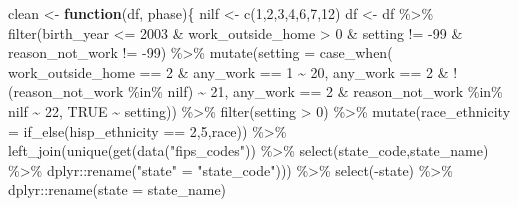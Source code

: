\documentclass[
]{article}
\newenvironment{Shaded}{\begin{snugshade}}{\end{snugshade}}
\newcommand{\AttributeTok}[1]{\textcolor[rgb]{0.77,0.63,0.00}{#1}}
\newcommand{\ConstantTok}[1]{\textcolor[rgb]{0.00,0.00,0.00}{#1}}
\newcommand{\ControlFlowTok}[1]{\textcolor[rgb]{0.13,0.29,0.53}{\textbf{#1}}}
\newcommand{\DecValTok}[1]{\textcolor[rgb]{0.00,0.00,0.81}{#1}}
\newcommand{\FunctionTok}[1]{\textcolor[rgb]{0.00,0.00,0.00}{#1}}
\newcommand{\NormalTok}[1]{#1}
\newcommand{\OtherTok}[1]{\textcolor[rgb]{0.56,0.35,0.01}{#1}}
\newcommand{\SpecialCharTok}[1]{\textcolor[rgb]{0.00,0.00,0.00}{#1}}
\newcommand{\StringTok}[1]{\textcolor[rgb]{0.31,0.60,0.02}{#1}}
\begin{document}
\begin{Shaded}
\begin{Highlighting}[]
\NormalTok{clean }\OtherTok{\textless{}{-}} \ControlFlowTok{function}\NormalTok{(df, phase)\{}
\NormalTok{ nilf }\OtherTok{\textless{}{-}} \FunctionTok{c}\NormalTok{(}\DecValTok{1}\NormalTok{,}\DecValTok{2}\NormalTok{,}\DecValTok{3}\NormalTok{,}\DecValTok{4}\NormalTok{,}\DecValTok{6}\NormalTok{,}\DecValTok{7}\NormalTok{,}\DecValTok{12}\NormalTok{)}
\NormalTok{ df }\OtherTok{\textless{}{-}}\NormalTok{ df }\SpecialCharTok{\%\textgreater{}\%} 
  \FunctionTok{filter}\NormalTok{(birth\_year }\SpecialCharTok{\textless{}=} \DecValTok{2003} \SpecialCharTok{\&}\NormalTok{ work\_outside\_home }\SpecialCharTok{\textgreater{}} \DecValTok{0} \SpecialCharTok{\&}\NormalTok{ setting }\SpecialCharTok{!=} \SpecialCharTok{{-}}\DecValTok{99} \SpecialCharTok{\&}\NormalTok{ reason\_not\_work }\SpecialCharTok{!=} \SpecialCharTok{{-}}\DecValTok{99}\NormalTok{) }\SpecialCharTok{\%\textgreater{}\%}
  \FunctionTok{mutate}\NormalTok{(}\AttributeTok{setting =} \FunctionTok{case\_when}\NormalTok{(}
\NormalTok{    work\_outside\_home }\SpecialCharTok{==} \DecValTok{2} \SpecialCharTok{\&}\NormalTok{ any\_work }\SpecialCharTok{==} \DecValTok{1} \SpecialCharTok{\textasciitilde{}} \DecValTok{20}\NormalTok{,}
\NormalTok{    any\_work }\SpecialCharTok{==} \DecValTok{2} \SpecialCharTok{\&} \SpecialCharTok{!}\NormalTok{(reason\_not\_work }\SpecialCharTok{\%in\%}\NormalTok{ nilf) }\SpecialCharTok{\textasciitilde{}} \DecValTok{21}\NormalTok{,}
\NormalTok{    any\_work }\SpecialCharTok{==} \DecValTok{2} \SpecialCharTok{\&}\NormalTok{ reason\_not\_work }\SpecialCharTok{\%in\%}\NormalTok{ nilf }\SpecialCharTok{\textasciitilde{}} \DecValTok{22}\NormalTok{,}
    \ConstantTok{TRUE} \SpecialCharTok{\textasciitilde{}}\NormalTok{ setting)) }\SpecialCharTok{\%\textgreater{}\%}
  \FunctionTok{filter}\NormalTok{(setting }\SpecialCharTok{\textgreater{}} \DecValTok{0}\NormalTok{) }\SpecialCharTok{\%\textgreater{}\%}
  \FunctionTok{mutate}\NormalTok{(}\AttributeTok{race\_ethnicity =} \FunctionTok{if\_else}\NormalTok{(hisp\_ethnicity }\SpecialCharTok{==} \DecValTok{2}\NormalTok{,}\DecValTok{5}\NormalTok{,race)) }\SpecialCharTok{\%\textgreater{}\%}
  \FunctionTok{left\_join}\NormalTok{(}\FunctionTok{unique}\NormalTok{(}\FunctionTok{get}\NormalTok{(}\FunctionTok{data}\NormalTok{(}\StringTok{"fips\_codes"}\NormalTok{)) }\SpecialCharTok{\%\textgreater{}\%} 
              \FunctionTok{select}\NormalTok{(state\_code,state\_name) }\SpecialCharTok{\%\textgreater{}\%} 
\NormalTok{              dplyr}\SpecialCharTok{::}\FunctionTok{rename}\NormalTok{(}\StringTok{"state"} \OtherTok{=} \StringTok{"state\_code"}\NormalTok{))) }\SpecialCharTok{\%\textgreater{}\%}
  \FunctionTok{select}\NormalTok{(}\SpecialCharTok{{-}}\NormalTok{state) }\SpecialCharTok{\%\textgreater{}\%} 
\NormalTok{  dplyr}\SpecialCharTok{::}\FunctionTok{rename}\NormalTok{(}\AttributeTok{state =}\NormalTok{ state\_name)}
 

\end{Highlighting}
\end{Shaded}
\end{document}
